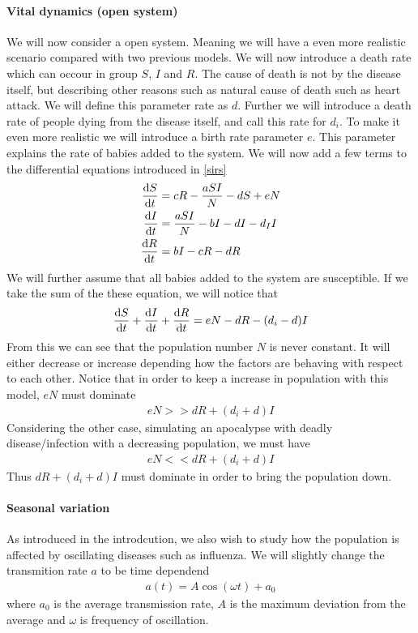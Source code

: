 \documentclass[a4paper, 10pt]{article}
\begin{document}
\paragraph{Vital dynamics (open system)}\label{vital dynamics} We will now consider a open system. Meaning
we will have a even more realistic scenario compared with two previous models. We will now introduce
a death rate which can occour in group $S$, $I$ and $R$. The cause of death is not by the disease itself, but describing
other reasons such as natural cause of death such as heart attack. We will define this parameter rate as
$d$. Further we will introduce a death rate of people dying from the disease itself, and call this rate for $d_{i}$.
To make it even more realistic we will introduce a birth rate parameter $e$. This parameter explains the rate of babies added to the system.
We will now add a few terms to the differential equations introduced in \eqref{sirs}
\begin{align*}
  \dv{S}{t} &= cR - \frac{aSI}{N} - dS + eN\\
  \dv{I}{t} &= \frac{aSI}{N} - bI - dI - d_{I}I\\
  \dv{R}{t} &= bI - cR - dR
\end{align*}
We will further assume that all babies added to the system are susceptible.
If we take the sum of the these equation, we will notice that
\begin{align}
\dv{S}{t} + \dv{I}{t} + \dv{R}{t} = eN - dR - (d_{i} - d)I
\end{align}
From this we can see that the population number $N$ is never constant. It will either decrease or increase depending how the
factors are behaving with respect to each other.
Notice that in order to keep a increase in population with this model, $eN$ must dominate
\begin{align}
  eN >> dR + (d_{i} + d)I
\end{align}
Considering the other case, simulating an apocalypse with deadly disease/infection with a decreasing population, we must have
\begin{align}
  eN << dR + (d_{i} + d)I
\end{align}
Thus $dR + (d_{i} + d)I$ must dominate in order to bring the population down.
\paragraph{Seasonal variation}\label{seasonal variation} As introduced in the introdcution, we
also wish to study how the
population is affected by oscillating diseases such as influenza. We will
slightly change the transmition rate $a$ to be time dependend
\begin{align}
  a(t) = A\cos{(\omega t)} + a_{0}
\end{align}
where $a_{0}$ is the average transmission rate, $A$ is the maximum deviation
from the average and $\omega$ is frequency of oscillation.
\end{document}
